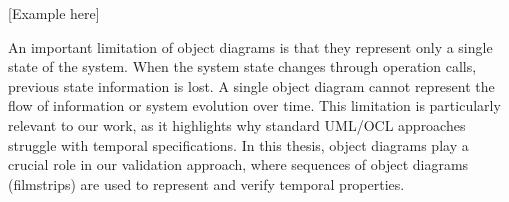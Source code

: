[Example here]

An important limitation of object diagrams is that they represent only a single 
state of the system. When the system state changes through operation calls, 
previous state information is lost. A single object diagram cannot represent 
the flow of information or system evolution over time. This limitation is 
particularly relevant to our work, as it highlights why standard UML/OCL approaches 
struggle with temporal specifications. In this thesis, object diagrams play a crucial 
role in our validation approach, where sequences of object diagrams (filmstrips) 
are used to represent and verify temporal properties.


